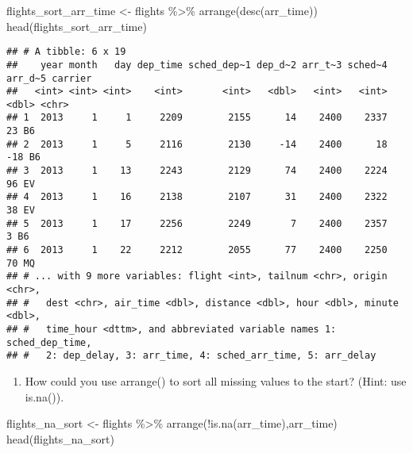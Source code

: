 \documentclass[
]{article}
\newenvironment{Shaded}{\begin{snugshade}}{\end{snugshade}}
\newcommand{\FunctionTok}[1]{\textcolor[rgb]{0.00,0.00,0.00}{#1}}
\newcommand{\NormalTok}[1]{#1}
\newcommand{\OtherTok}[1]{\textcolor[rgb]{0.56,0.35,0.01}{#1}}
\newcommand{\SpecialCharTok}[1]{\textcolor[rgb]{0.00,0.00,0.00}{#1}}
\providecommand{\tightlist}{%
  \setlength{\itemsep}{0pt}\setlength{\parskip}{0pt}}
\begin{document}
\begin{Shaded}
\begin{Highlighting}[]
\NormalTok{flights\_sort\_arr\_time }\OtherTok{\textless{}{-}}\NormalTok{ flights }\SpecialCharTok{\%\textgreater{}\%} \FunctionTok{arrange}\NormalTok{(}\FunctionTok{desc}\NormalTok{(arr\_time))}
\FunctionTok{head}\NormalTok{(flights\_sort\_arr\_time)}
\end{Highlighting}
\end{Shaded}

\begin{verbatim}
## # A tibble: 6 x 19
##    year month   day dep_time sched_dep~1 dep_d~2 arr_t~3 sched~4 arr_d~5 carrier
##   <int> <int> <int>    <int>       <int>   <dbl>   <int>   <int>   <dbl> <chr>  
## 1  2013     1     1     2209        2155      14    2400    2337      23 B6     
## 2  2013     1     5     2116        2130     -14    2400      18     -18 B6     
## 3  2013     1    13     2243        2129      74    2400    2224      96 EV     
## 4  2013     1    16     2138        2107      31    2400    2322      38 EV     
## 5  2013     1    17     2256        2249       7    2400    2357       3 B6     
## 6  2013     1    22     2212        2055      77    2400    2250      70 MQ     
## # ... with 9 more variables: flight <int>, tailnum <chr>, origin <chr>,
## #   dest <chr>, air_time <dbl>, distance <dbl>, hour <dbl>, minute <dbl>,
## #   time_hour <dttm>, and abbreviated variable names 1: sched_dep_time,
## #   2: dep_delay, 3: arr_time, 4: sched_arr_time, 5: arr_delay
\end{verbatim}

\begin{enumerate}
\def\labelenumi{\arabic{enumi}.}
\setcounter{enumi}{5}
\tightlist
\item
  How could you use arrange() to sort all missing values to the start?
  (Hint: use is.na()).
\end{enumerate}

\begin{Shaded}
\begin{Highlighting}[]
\NormalTok{flights\_na\_sort }\OtherTok{\textless{}{-}}\NormalTok{ flights }\SpecialCharTok{\%\textgreater{}\%} \FunctionTok{arrange}\NormalTok{(}\SpecialCharTok{!}\FunctionTok{is.na}\NormalTok{(arr\_time),arr\_time)}
\FunctionTok{head}\NormalTok{(flights\_na\_sort)}
\end{Highlighting}
\end{Shaded}
\end{document}
